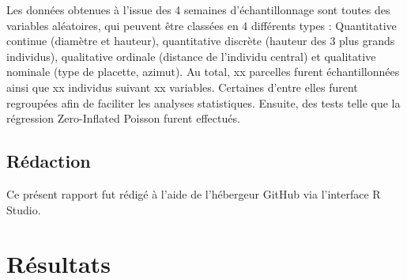 \documentclass[
  
  
  
  
  ]{book}
\makeatletter
\newcommand{\MemoirChapStyle}{}
\newcommand{\MemoirPageStyle}{}
\newlength\widthw %
\newlength{\rf}
\newcommand*{\SmallMargins}{
  \setlrmarginsandblock{}{}{*}
  \setmarginnotes{0.1in}{0.1in}{0.1in}
 \setulmarginsandblock{}{}{*}
  \checkandfixthelayout
  \ch@ngetext
  \clearpage
  \setlength{\widthw}{\textwidth+\marginparsep+\marginparwidth}
  \footnotesatfoot
  \chapterstyle{\MemoirChapStyle}  %
  \pagestyle{\MemoirPageStyle}
}
\newcommand{\evenpage}{
  \clearpage
  \strictpagecheck %
  \checkoddpage
  \ifoddpage
    \thispagestyle{empty}
    ~\\ %
    \newpage
  \else
  \fi
}
\makeatother
\begin{document}
Les données obtenues à l'issue des 4 semaines d'échantillonnage sont toutes des variables aléatoires, qui peuvent être classées en 4 différents types : Quantitative continue (diamètre et hauteur), quantitative discrète (hauteur des 3 plus grands individus), qualitative ordinale (distance de l'individu central) et qualitative nominale (type de placette, azimut).
Au total, xx parcelles furent échantillonnées ainsi que xx individus suivant xx variables.
Certaines d'entre elles furent regroupées afin de faciliter les analyses statistiques.
Ensuite, des tests telle que la régression Zero-Inflated Poisson furent effectués.

\hypertarget{ruxe9daction}{%
\section{Rédaction}\label{ruxe9daction}}

Ce présent rapport fut rédigé à l'aide de l'hébergeur GitHub via l'interface R Studio.

\hypertarget{ruxe9sultats}{%
\chapter{Résultats}\label{ruxe9sultats}}



\backmatter
\SmallMargins

\printbibliography[title=Discussion]
\onecolumn











\evenpage
\SmallMargins
\thispagestyle{empty}
\end{document}
